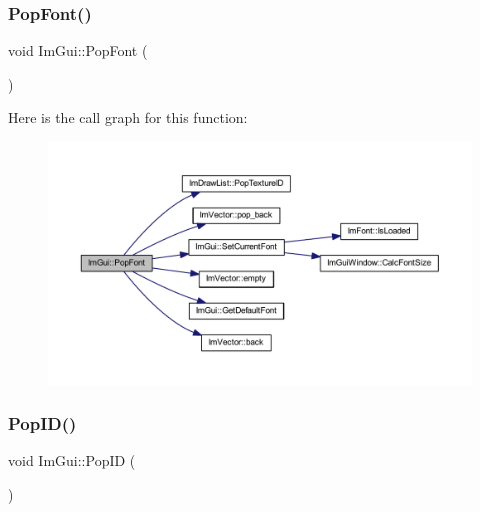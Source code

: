 \subsubsection{\texorpdfstring{Pop\+Font()}{PopFont()}}
{\footnotesize\ttfamily void Im\+Gui\+::\+Pop\+Font (\begin{DoxyParamCaption}{ }\end{DoxyParamCaption})}

Here is the call graph for this function\+:
\nopagebreak
\begin{figure}[H]
\begin{center}
\leavevmode
\includegraphics[width=350pt]{namespace_im_gui_af66649bc37022bf3cf2496c73af9a499_cgraph}
\end{center}
\end{figure}
\mbox{\label{namespace_im_gui_aba0b2d8f890a5d435ae43d0c4a2d4dd1}} 
\subsubsection{\texorpdfstring{Pop\+I\+D()}{PopID()}}
{\footnotesize\ttfamily void Im\+Gui\+::\+Pop\+ID (\begin{DoxyParamCaption}{ }\end{DoxyParamCaption})}


